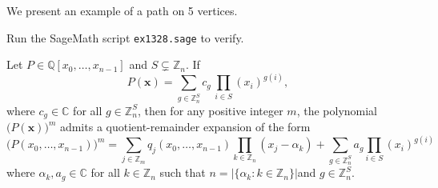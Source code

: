 \begin{example} We present an example of a path on 5 vertices.
\ \\
\begin{center}   
\end{center}
Run the SageMath script \texttt{ex1328.sage} to verify.
\end{example}

\begin{lemma} \label{lem:variable-dependency}
Let $P\in\mathbb{Q}\left[x_{0},\ldots,x_{n-1}\right]$
and $S\subsetneq\mathbb{Z}_{n}$. If 
\begin{equation}
P(\mathbf{x})=\sum_{g\in\mathbb{Z}_{n}^{S}}c_{g}\,\prod_{i\in S}(x_{i})^{g(i)},
\end{equation}
where $c_g \in\mathbb{C}$ for all $g\in\mathbb{Z}_{n}^{S}$, then for any positive integer $m$, the polynomial $\big(P(\mathbf{x})\big)^{m}$
admits a quotient-remainder expansion of the form
\begin{equation}
\big(P(x_0,\ldots,x_{n-1})\big)^{m}=\sum_{j\in\mathbb{Z}_{m}}q_{j}(x_0,\ldots,x_{n-1})\prod_{k\in\mathbb{Z}_{n}}(x_{j}-\alpha_{k})+\sum_{g\in\mathbb{Z}_{n}^{S}}a_{g}\prod_{i\in S}(x_{i})^{g(i)}
\end{equation}
where $\alpha_k, a_g\in \mathbb{C}$ for all $k\in \mathbb{Z}_n$ such that $n=\left|\big\{\alpha_{k}:k\in\mathbb{Z}_{n}\big\}\right|$and $g\in\mathbb{Z}_{n}^{S}$.
\end{lemma}

